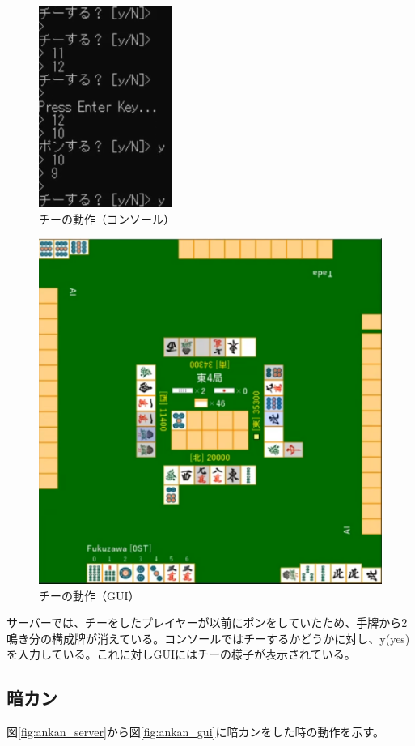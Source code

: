 \documentclass[a4j,titlepage]{jsarticle}
\begin{document}
\begin{figure}[H]
  \centering
  \includegraphics[scale = 1.2]{images/chi_console.png}
  \caption{チーの動作（コンソール）}
  \label{fig:chi_console}
\end{figure}

\begin{figure}[H]
  \centering
  \includegraphics[scale = 0.8]{images/chi_gui.png}
  \caption{チーの動作（GUI）}
  \label{fig:chi_gui}
\end{figure}

サーバーでは、チーをしたプレイヤーが以前にポンをしていたため、手牌から2鳴き分の構成牌が消えている。コンソールではチーするかどうかに対し、y(yes)を入力している。これに対しGUIにはチーの様子が表示されている。

\subsection{暗カン}
図\ref{fig:ankan_server}から図\ref{fig:ankan_gui}に暗カンをした時の動作を示す。
\end{document}
